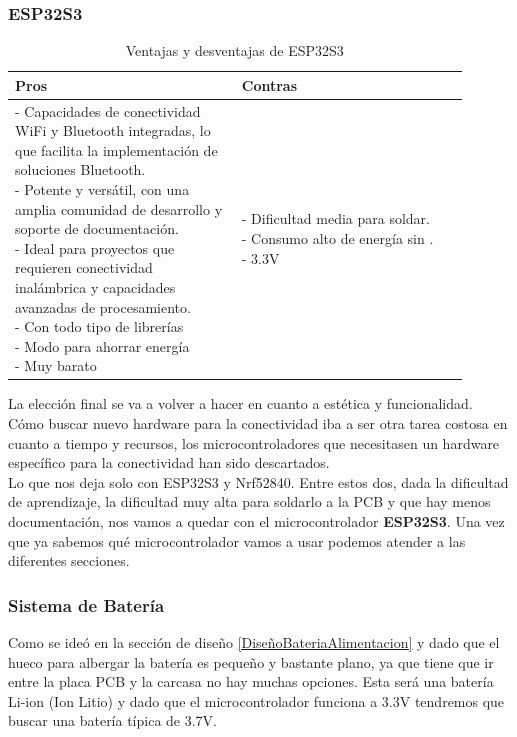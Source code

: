 \subsubsection{ESP32S3}
\begin{table}[H]
\centering
\small
\begin{tabular}{|p{0.45\linewidth}|p{0.45\linewidth}|}
\hline
\textbf{Pros} &
\textbf{Contras} \\
\hline
\parbox[t]{\linewidth}{
\vspace{0.1cm}
- Capacidades de conectividad \gls{WiFi} y \gls{Bluetooth} integradas, lo que facilita la implementación de soluciones \gls{Bluetooth}. \medskip \\
- Potente y versátil, con una amplia comunidad de desarrollo y soporte de documentación. \medskip \\
- Ideal para proyectos que requieren conectividad inalámbrica y capacidades avanzadas de procesamiento. \medskip \\
- Con todo tipo de librerías \medskip \\
- Modo  para ahorrar energía \medskip \\
- Muy barato \vspace{0.3cm}
} &
\parbox[t]{\linewidth}{
\vspace{0.1cm}
- Dificultad media para soldar. \medskip \\
- Consumo alto de energía sin . \medskip \\
- 3.3V } \medskip \\
\hline
\end{tabular}
\caption{Ventajas y desventajas de ESP32S3}
\end{table}

La elección final se va a volver a hacer en cuanto a estética y funcionalidad. Cómo buscar nuevo hardware para la conectividad  iba a ser otra tarea costosa en cuanto a tiempo y recursos, los microcontroladores que necesitasen un hardware específico para la conectividad han sido descartados.\\
Lo que nos deja solo con ESP32S3 y Nrf52840. Entre estos dos, dada la dificultad de aprendizaje, la dificultad muy alta para soldarlo a la \gls{PCB} y que hay menos documentación, nos vamos a quedar con el microcontrolador \textbf{ESP32S3}. Una vez que ya sabemos qué microcontrolador vamos a usar podemos atender a las diferentes secciones.

\subsubsection{Sistema de Batería} \label{InvestigacionSistemaBateria}
Como se ideó en la sección de diseño \ref{DiseñoBateriaAlimentacion} y dado que el hueco para albergar la batería es pequeño y bastante plano, ya que tiene que ir entre la placa \gls{PCB} y la carcasa no hay muchas opciones. Esta será una batería Li-ion (Ion Litio) y dado que el microcontrolador funciona a 3.3V tendremos que buscar una batería típica de 3.7V.

